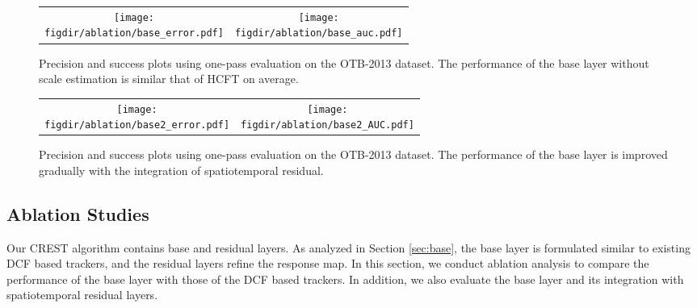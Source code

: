 \documentclass[10pt,twocolumn,letterpaper]{article}
\newcommand{\figdir}{figures}
\newcommand{\ryn}[1]{{\color{black}{#1}}}
\begin{document}
\def\swtwo{0.495\linewidth}
\renewcommand{\tabcolsep}{.1pt}
\begin{figure}[t]
\begin{center}
\begin{tabular}{cc}
\texttt{[image: \\figdir/ablation/base\_error.pdf]}&
\texttt{[image: \\figdir/ablation/base\_auc.pdf]}
\end{tabular}
\end{center}
\vspace{-5mm}
\caption{Precision and success plots using one-pass evaluation on the OTB-2013 dataset.
The performance of the base layer without scale estimation is similar \ryn{to} that of HCFT \cite{chao-iccv15-HCF} on average.}
\label{fig:abla1}
\begin{center}
\begin{tabular}{cc}
\texttt{[image: \\figdir/ablation/base2\_error.pdf]}&
\texttt{[image: \\figdir/ablation/base2\_AUC.pdf]}
\end{tabular}
\end{center}
\vspace{-5mm}
\caption{Precision and success plots using one-pass evaluation on the OTB-2013 dataset.
The performance of the base layer is improved gradually with the integration of spatiotemporal residual.}
\label{fig:abla2}
\vspace{-3mm}
\end{figure}



\subsection{Ablation Studies}\label{sec:ablation}

Our CREST algorithm contains base and residual layers. As analyzed in Section \ref{sec:base}, the base layer is formulated similar to existing DCF based trackers, and the residual layers refine the response map. In this section, we conduct ablation analysis to compare the performance of the base layer with those of the DCF based trackers. In addition, we also evaluate the base layer and its integration with spatiotemporal residual layers.
\end{document}

